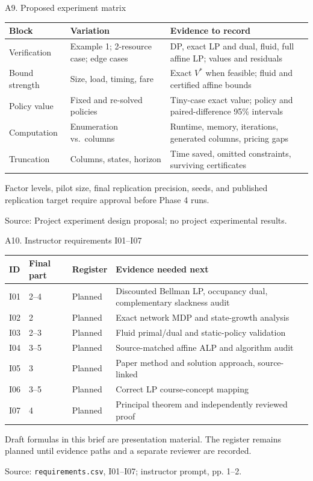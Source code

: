 \documentclass[aspectratio=169,10pt]{beamer}
\newcommand{\src}[1]{\par\vfill{\tiny\color{muted}Source: #1\par}}
\begin{document}
\begin{frame}[t]{A9. Proposed experiment matrix}
\footnotesize
\begin{tabularx}{\textwidth}{@{}p{}p{}X@{}}
\toprule
Block & Variation & Evidence to record\\
\midrule
Verification & Example 1; 2-resource case; edge cases & DP, exact LP and dual, fluid, full affine LP; values and residuals\\
Bound strength & Size, load, timing, fare & Exact $V^*$ when feasible; fluid and certified affine bounds\\
Policy value & Fixed and re-solved policies & Tiny-case exact value; policy and paired-difference 95\% intervals\\
Computation & Enumeration vs.\ columns & Runtime, memory, iterations, generated columns, pricing gaps\\
Truncation & Columns, states, horizon & Time saved, omitted constraints, surviving certificates\\
\bottomrule
\end{tabularx}
\medskip\par
Factor levels, pilot size, final replication precision, seeds, and published replication target require approval before Phase 4 runs.
\src{Project experiment design proposal; no project experimental results.}
\end{frame}

\begin{frame}[t]{A10. Instructor requirements I01--I07}
\footnotesize
\begin{tabularx}{\textwidth}{@{}p{}p{}p{}X@{}}
\toprule
ID & Final part & Register & Evidence needed next\\
\midrule
I01 & 2--4 & Planned & Discounted Bellman LP, occupancy dual, complementary slackness audit\\
I02 & 2 & Planned & Exact network MDP and state-growth analysis\\
I03 & 2--3 & Planned & Fluid primal/dual and static-policy validation\\
I04 & 3--5 & Planned & Source-matched affine ALP and algorithm audit\\
I05 & 3 & Planned & Paper method and solution approach, source-linked\\
I06 & 3--5 & Planned & Correct LP course-concept mapping\\
I07 & 4 & Planned & Principal theorem and independently reviewed proof\\
\bottomrule
\end{tabularx}
\medskip\par
Draft formulas in this brief are presentation material. The register remains planned until evidence paths and a separate reviewer are recorded.
\src{\texttt{requirements.csv}, I01--I07; instructor prompt, pp. 1--2.}
\end{frame}
\end{document}
